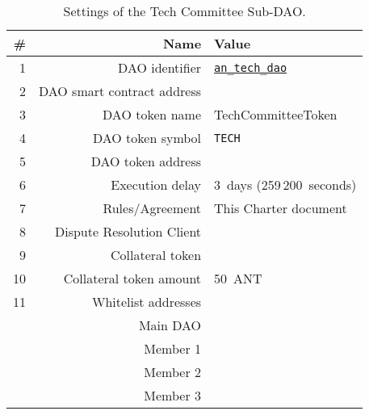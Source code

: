 \begin{table}[h!]
	\caption{Settings of the Tech Committee Sub-DAO.}
	\centering
	\begin{tabular}{rrl}
		\toprule
		\# & Name & Value \\
		\midrule
		1 & \ac{DAO} identifier & \href{https://govern.aragon.org/\#/daos/an_tech_dao}{\texttt{an\_tech\_dao}}\\
		2 & \ac{DAO} smart contract address & \techSubDaoAddr\\
		3 & \ac{DAO} token name & TechCommitteeToken\\
		4 & \ac{DAO} token symbol & \texttt{TECH}\\
		5 & \ac{DAO} token address & \techSubDaoTokenAddr\\
		6 & Execution delay & 3~days (259\,200~seconds)\\
		7 & Rules/Agreement & This Charter document\\
		8 & Dispute Resolution Client & \aragonCourtAddr\\
		9 & Collateral token & \antTokenAddr\\
		10 & Collateral token amount & 50~\ac{ANT}\\
		11 & Whitelist addresses \\
		& Main \ac{DAO} & \mainDaoAddr\\
		& Member 1 & \techSubDaoMemberAddrI\\
		& Member 2 & \techSubDaoMemberAddrII\\
		& Member 3 & \techSubDaoMemberAddrIII\\
		\bottomrule
	\end{tabular}
\end{table}




